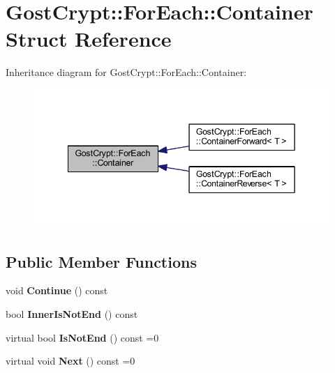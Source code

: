 \hypertarget{struct_gost_crypt_1_1_for_each_1_1_container}{}\section{Gost\+Crypt\+:\+:For\+Each\+:\+:Container Struct Reference}
\label{struct_gost_crypt_1_1_for_each_1_1_container}


Inheritance diagram for Gost\+Crypt\+:\+:For\+Each\+:\+:Container\+:
\nopagebreak
\begin{figure}[H]
\begin{center}
\leavevmode
\includegraphics[width=342pt]{struct_gost_crypt_1_1_for_each_1_1_container__inherit__graph}
\end{center}
\end{figure}
\subsection*{Public Member Functions}
\begin{DoxyCompactItemize}
\item 
\mbox{\label{struct_gost_crypt_1_1_for_each_1_1_container_a4ff12524e27fb2a7d1435e3dafb88bc5}} 
void {\bfseries Continue} () const
\item 
\mbox{\label{struct_gost_crypt_1_1_for_each_1_1_container_a565c5251d1c0c4f5e05f722f8a11add4}} 
bool {\bfseries Inner\+Is\+Not\+End} () const
\item 
\mbox{\label{struct_gost_crypt_1_1_for_each_1_1_container_a4b6b9e772b32a5e7fdb17d454f0aaaa7}} 
virtual bool {\bfseries Is\+Not\+End} () const =0
\item 
\mbox{\label{struct_gost_crypt_1_1_for_each_1_1_container_a2d082fc3d3f80e242dd08f8d398e3c0b}} 
virtual void {\bfseries Next} () const =0
\end{DoxyCompactItemize}
